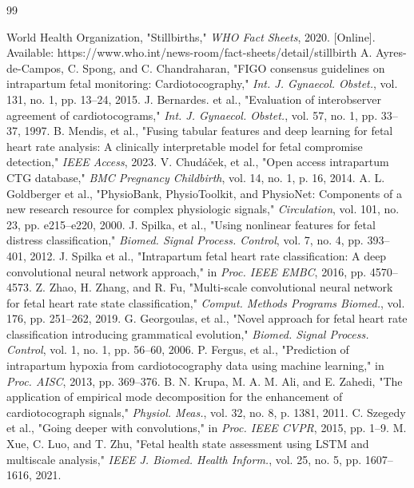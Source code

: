 \documentclass[12pt,a4paper]{report}
\begin{document}
\renewcommand{\bibname}{References}
\begin{thebibliography}{99}

 World Health Organization, "Stillbirths," \textit{WHO Fact Sheets}, 2020. [Online]. Available: https://www.who.int/news-room/fact-sheets/detail/stillbirth
 A. Ayres-de-Campos, C. Spong, and C. Chandraharan, "FIGO consensus guidelines on intrapartum fetal monitoring: Cardiotocography," \textit{Int. J. Gynaecol. Obstet.}, vol. 131, no. 1, pp. 13--24, 2015.
 J. Bernardes. et al., "Evaluation of interobserver agreement of cardiotocograms," \textit{Int. J. Gynaecol. Obstet.}, vol. 57, no. 1, pp. 33--37, 1997.
 B. Mendis, et al., "Fusing tabular features and deep learning for fetal heart rate analysis: A clinically interpretable model for fetal compromise detection," \textit{IEEE Access}, 2023.
 V. Chudáček, et al., "Open access intrapartum CTG database," \textit{BMC Pregnancy Childbirth}, vol. 14, no. 1, p. 16, 2014.
 A. L. Goldberger et al., "PhysioBank, PhysioToolkit, and PhysioNet: Components of a new research resource for complex physiologic signals," \textit{Circulation}, vol. 101, no. 23, pp. e215--e220, 2000.
 J. Spilka, et al., "Using nonlinear features for fetal distress classification," \textit{Biomed. Signal Process. Control}, vol. 7, no. 4, pp. 393--401, 2012.
 J. Spilka et al., "Intrapartum fetal heart rate classification: A deep convolutional neural network approach," in \textit{Proc. IEEE EMBC}, 2016, pp. 4570--4573.
 Z. Zhao, H. Zhang, and R. Fu, "Multi-scale convolutional neural network for fetal heart rate state classification," \textit{Comput. Methods Programs Biomed.}, vol. 176, pp. 251--262, 2019.
 G. Georgoulas, et al., "Novel approach for fetal heart rate classification introducing grammatical evolution," \textit{Biomed. Signal Process. Control}, vol. 1, no. 1, pp. 56--60, 2006.
 P. Fergus, et al., "Prediction of intrapartum hypoxia from cardiotocography data using machine learning," in \textit{Proc. AISC}, 2013, pp. 369--376.
 B. N. Krupa, M. A. M. Ali, and E. Zahedi, "The application of empirical mode decomposition for the enhancement of cardiotocograph signals," \textit{Physiol. Meas.}, vol. 32, no. 8, p. 1381, 2011.
 C. Szegedy et al., "Going deeper with convolutions," in \textit{Proc. IEEE CVPR}, 2015, pp. 1--9.
 M. Xue, C. Luo, and T. Zhu, "Fetal health state assessment using LSTM and multiscale analysis," \textit{IEEE J. Biomed. Health Inform.}, vol. 25, no. 5, pp. 1607--1616, 2021.

\end{thebibliography}
\end{document}
